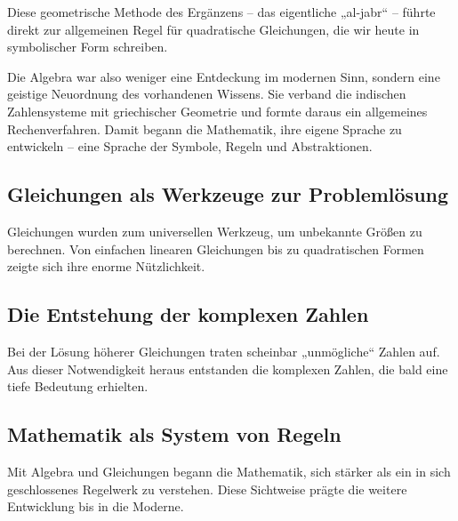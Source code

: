 Diese geometrische Methode des Ergänzens – das eigentliche „al-jabr“ – 
führte direkt zur allgemeinen Regel für quadratische Gleichungen, 
die wir heute in symbolischer Form schreiben.  


Die Algebra war also weniger eine Entdeckung im modernen Sinn, 
sondern eine geistige Neuordnung des vorhandenen Wissens. 
Sie verband die indischen Zahlensysteme mit griechischer Geometrie 
und formte daraus ein allgemeines Rechenverfahren. 
Damit begann die Mathematik, ihre eigene Sprache zu entwickeln – 
eine Sprache der Symbole, Regeln und Abstraktionen.

\subsection{Gleichungen als Werkzeuge zur Problemlösung}
Gleichungen wurden zum universellen Werkzeug, um unbekannte Größen zu berechnen. 
Von einfachen linearen Gleichungen bis zu quadratischen Formen zeigte sich ihre enorme Nützlichkeit. 

\subsection{Die Entstehung der komplexen Zahlen}
Bei der Lösung höherer Gleichungen traten scheinbar „unmögliche“ Zahlen auf. 
Aus dieser Notwendigkeit heraus entstanden die komplexen Zahlen, die bald eine tiefe Bedeutung erhielten. 

\subsection{Mathematik als System von Regeln}
Mit Algebra und Gleichungen begann die Mathematik, sich stärker als ein in sich geschlossenes Regelwerk zu verstehen. 
Diese Sichtweise prägte die weitere Entwicklung bis in die Moderne. 
